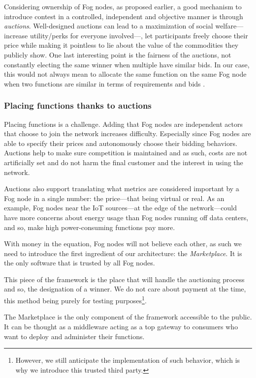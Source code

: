Considering ownership of Fog nodes, as proposed earlier, a good mechanism to introduce contest in a controlled, independent and objective manner is through \emph{auctions}. Well-designed auctions can lead to a maximization of social welfare—increase utility/perks for everyone involved—, let participants freely choose their price while making it pointless to lie about the value of the commodities they publicly show. One last interesting point is the fairness of the auctions, not constantly electing the same winner when multiple have similar bids. In our case, this would not always mean to allocate the same function on the same Fog node when two functions are similar in terms of requirements and bids \cite{kuo_proportionnet_2020}.

\subsubsection{Placing functions thanks to auctions}

Placing functions is a challenge. Adding that Fog nodes are independent actors that choose to join the network increases difficulty. Especially since Fog nodes are able to specify their prices and autonomously choose their bidding behaviors. Auctions help to make sure competition is maintained and as such, costs are not artificially set and do not harm the final customer and the interest in using the network.

Auctions also support translating what metrics are considered important by a Fog node in a single number: the price—that being virtual or real. As an example, Fog nodes near the \gls{IoT} sources—at the edge of the network—could have more concerns about energy usage than Fog nodes running off data centers, and so, make high power-consuming functions pay more.

With money in the equation, Fog nodes will not believe each other, as such we need to introduce the first ingredient of our architecture: the \emph{Marketplace}. It is the only software that is trusted by all Fog nodes.

This piece of the framework is the place that will handle the auctioning process and so, the designation of a winner. We do not care about payment at the time, this method being purely for testing purposes\footnote{However, we still anticipate the implementation of such behavior, which is why we introduce this trusted third party.}.

The Marketplace is the only component of the framework accessible to the public. It can be thought as a middleware acting as a top gateway to consumers who want to deploy and administer their functions.

